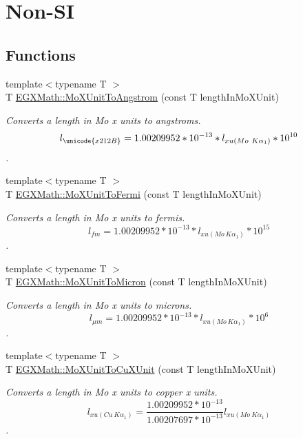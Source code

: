 \hypertarget{group___e_g_x_math-_conversions-_length_conversions-_non-_s_i-_mo_x_unit-_non-_s_i}{}\section{Non-\/\+SI}
\label{group___e_g_x_math-_conversions-_length_conversions-_non-_s_i-_mo_x_unit-_non-_s_i}
\subsection*{Functions}
\begin{DoxyCompactItemize}
\item 
{\footnotesize template$<$typename T $>$ }\\T \mbox{\hyperlink{group___e_g_x_math-_conversions-_length_conversions-_non-_s_i-_mo_x_unit-_non-_s_i_ga1846652500863bdef905f209f3c5e0ae}{E\+G\+X\+Math\+::\+Mo\+X\+Unit\+To\+Angstrom}} (const T length\+In\+Mo\+X\+Unit)
\begin{DoxyCompactList}\small\item\em Converts a length in Mo x units to angstroms. \[ l_{\unicode{x212B}}=1.00209952*10^{-13} * l_{xu(Mo\ K\alpha_1)} * 10^{10} \]. \end{DoxyCompactList}\item 
{\footnotesize template$<$typename T $>$ }\\T \mbox{\hyperlink{group___e_g_x_math-_conversions-_length_conversions-_non-_s_i-_mo_x_unit-_non-_s_i_gac8cb731cb2dd7df67818cade6f80c011}{E\+G\+X\+Math\+::\+Mo\+X\+Unit\+To\+Fermi}} (const T length\+In\+Mo\+X\+Unit)
\begin{DoxyCompactList}\small\item\em Converts a length in Mo x units to fermis. \[ l_{fm}=1.00209952*10^{-13} * l_{xu(Mo\ K\alpha_1)} * 10^{15} \]. \end{DoxyCompactList}\item 
{\footnotesize template$<$typename T $>$ }\\T \mbox{\hyperlink{group___e_g_x_math-_conversions-_length_conversions-_non-_s_i-_mo_x_unit-_non-_s_i_ga8fa37a1f86f7b01d2ca395fb7d2b75ce}{E\+G\+X\+Math\+::\+Mo\+X\+Unit\+To\+Micron}} (const T length\+In\+Mo\+X\+Unit)
\begin{DoxyCompactList}\small\item\em Converts a length in Mo x units to microns. \[ l_{\mu m}=1.00209952*10^{-13} * l_{xu(Mo\ K\alpha_1)} * 10^{6} \]. \end{DoxyCompactList}\item 
{\footnotesize template$<$typename T $>$ }\\T \mbox{\hyperlink{group___e_g_x_math-_conversions-_length_conversions-_non-_s_i-_mo_x_unit-_non-_s_i_ga15685a2e91cbe4f0ae403ed1b4c9b9b4}{E\+G\+X\+Math\+::\+Mo\+X\+Unit\+To\+Cu\+X\+Unit}} (const T length\+In\+Mo\+X\+Unit)
\begin{DoxyCompactList}\small\item\em Converts a length in Mo x units to copper x units. \[ l_{xu(Cu\ K\alpha_1)}= \frac{1.00209952*10^{-13}}{1.00207697*10^{-13}} l_{xu(Mo\ K\alpha_1)}\]. \end{DoxyCompactList}\end{DoxyCompactItemize}


